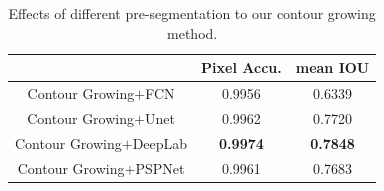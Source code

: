 \begin{table}[t]
\begin{center}
\caption{Effects of different pre-segmentation to our contour growing method.} \label{tab:report2}
\begin{tabular}{|c|c|c|}
  \hline
   & Pixel Accu. & mean IOU
  \\
  \hline
  Contour Growing$+$FCN & 0.9956 & 0.6339 \\
  Contour Growing$+$Unet & 0.9962 & 0.7720 \\
  Contour Growing$+$DeepLab & \textbf{0.9974} & \textbf{0.7848} \\
  Contour Growing$+$PSPNet & 0.9961 & 0.7683 \\
  \hline
\end{tabular}
\end{center}
\end{table}


